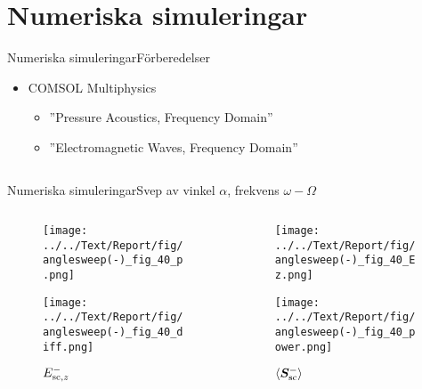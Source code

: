 \documentclass[11pt]{beamer}
\begin{document}
	\section{Numeriska simuleringar}
	
	\begin{frame}{Numeriska simuleringar}{Förberedelser}
		\begin{itemize}
			\item COMSOL Multiphysics
			\pause
			\begin{itemize}
				\item ''Pressure Acoustics, Frequency Domain''
				\item ''Electromagnetic Waves, Frequency Domain''
			\end{itemize}
			\pause
		\end{itemize}
		\begin{columns}
			\begin{column}{0.5\textwidth}
				\resizebox{\textwidth}{!}{}
			\end{column}
			\begin{column}{0.5\textwidth}
				\resizebox{\textwidth}{!}{}
			\end{column}
		\end{columns}
	\end{frame}
	
	\begin{frame}{Numeriska simuleringar}{Svep av vinkel $\alpha$, frekvens $\omega - \Omega$}
		\begin{columns}
			\begin{column}{0.5\textwidth}
				\begin{figure}
					\centering
					\begin{overprint}
						\onslide<1>
						\texttt{[image: ../../Text/Report/fig/anglesweep(-)\_fig\_40\_p.png]}
						\caption*{$p$}
						
						\onslide<2>
						\texttt{[image: ../../Text/Report/fig/anglesweep(-)\_fig\_40\_diff.png]}
						\caption*{$E_{\mathrm{sc}, z}^-$}
					\end{overprint}
				\end{figure}
			\end{column}
			\begin{column}{0.5\textwidth}
				\begin{figure}
					\centering
					\begin{overprint}
						\onslide<1>
						\texttt{[image: ../../Text/Report/fig/anglesweep(-)\_fig\_40\_Ez.png]}
						\caption*{$E_{\mrm{i}, z}$}
						
						\onslide<2>
						\texttt{[image: ../../Text/Report/fig/anglesweep(-)\_fig\_40\_power.png]}
						\caption*{$\left< \bm{S}_{\mathrm{sc}}^- \right>$}
					\end{overprint}
				\end{figure}
			\end{column}
		\end{columns}
	\end{frame}
	
\end{document}
